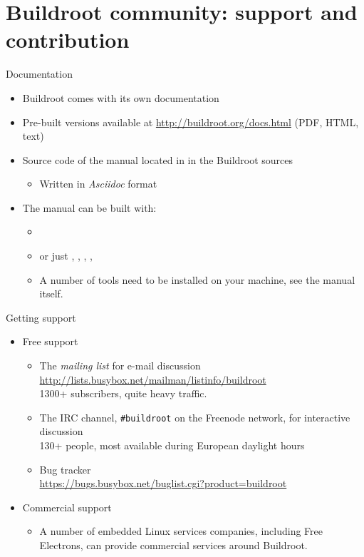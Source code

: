 \section{Buildroot community: support and contribution}

\begin{frame}{Documentation}
  \begin{itemize}
  \item Buildroot comes with its own documentation
  \item Pre-built versions available at
    \url{http://buildroot.org/docs.html} (PDF, HTML, text)
  \item Source code of the manual located in  in the
    Buildroot sources
    \begin{itemize}
    \item Written in {\em Asciidoc} format
    \end{itemize}
  \item The manual can be built with:
    \begin{itemize}
    \item {}
    \item or just , ,
      , , 
    \item A number of tools need to be installed on your machine,
      see the manual itself.
    \end{itemize}
  \end{itemize}
\end{frame}

\begin{frame}{Getting support}
  \begin{itemize}
  \item Free support
    \begin{itemize}
    \item The {\em mailing list} for e-mail discussion\\
      {\footnotesize \url{http://lists.busybox.net/mailman/listinfo/buildroot}}\\
      1300+ subscribers, quite heavy traffic.
    \item The IRC channel, {\tt \#buildroot} on the Freenode network,
      for interactive discussion\\
      130+ people, most available during European daylight hours
    \item Bug tracker\\
      \url{https://bugs.busybox.net/buglist.cgi?product=buildroot}
    \end{itemize}
  \item Commercial support
    \begin{itemize}
    \item A number of embedded Linux services companies, including
      Free Electrons, can provide commercial services around
      Buildroot.
    \end{itemize}
  \end{itemize}
\end{frame}


